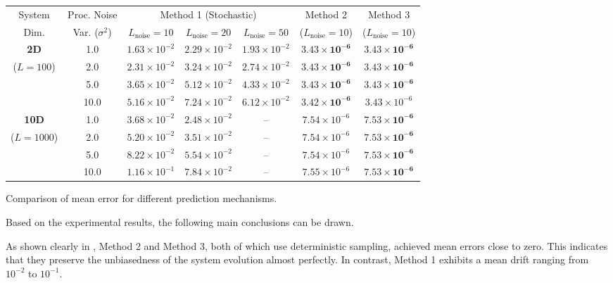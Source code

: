 \begin{Table}[ht]
	\centering
	\small
	\begin{tabular}{|c|c|c|c|c|c|c|}
		\hline
		System & Proc. Noise & \multicolumn{3}{c|}{Method 1 (Stochastic)} & Method 2 & Method 3 \\ \cline{3-5}
		Dim. & Var. ($\sigma^2$) & $L_{\mathrm{noise}}=10$ & $L_{\mathrm{noise}}=20$ & $L_{\mathrm{noise}}=50$ & ($L_{\mathrm{noise}}=10$) & ($L_{\mathrm{noise}}=10$) \\ \hline
		\textbf{2D}  & 1.0  & $1.63 \times 10^{-2}$ & $2.29 \times 10^{-2}$ & $1.93 \times 10^{-2}$ & $\bm{3.43 \times 10^{-6}}$ & $\bm{3.43 \times 10^{-6}}$ \\ \cline{2-7}
		($L=100$)    & 2.0  & $2.31 \times 10^{-2}$ & $3.24 \times 10^{-2}$ & $2.74 \times 10^{-2}$ & $\bm{3.43 \times 10^{-6}}$ & $\bm{3.43 \times 10^{-6}}$ \\ \cline{2-7}
		& 5.0  & $3.65 \times 10^{-2}$ & $5.12 \times 10^{-2}$ & $4.33 \times 10^{-2}$ & $\bm{3.43 \times 10^{-6}}$ & $\bm{3.43 \times 10^{-6}}$ \\ \cline{2-7}
		& 10.0 & $5.16 \times 10^{-2}$ & $7.24 \times 10^{-2}$ & $6.12 \times 10^{-2}$ & $\bm{3.42 \times 10^{-6}}$ & $3.43 \times 10^{-6}$ \\ \hline
		\textbf{10D} & 1.0  & $3.68 \times 10^{-2}$ & $2.48 \times 10^{-2}$ & --     & $7.54 \times 10^{-6}$ & $\bm{7.53 \times 10^{-6}}$ \\ \cline{2-7}
		($L=1000$)   & 2.0  & $5.20 \times 10^{-2}$ & $3.51 \times 10^{-2}$ & --     & $7.54 \times 10^{-6}$ & $\bm{7.53 \times 10^{-6}}$ \\ \cline{2-7}
		& 5.0  & $8.22 \times 10^{-2}$ & $5.54 \times 10^{-2}$ & --     & $7.54 \times 10^{-6}$ & $\bm{7.53 \times 10^{-6}}$ \\ \cline{2-7}
		& 10.0 & $1.16 \times 10^{-1}$ & $7.84 \times 10^{-2}$ & --     & $7.55 \times 10^{-6}$ & $\bm{7.53 \times 10^{-6}}$ \\ \hline
	\end{tabular}
	\caption{Comparison of mean error for different prediction mechanisms.}
	\label{tab:mean_error}
\end{Table}

Based on the experimental results, the following main conclusions can be drawn.

As shown clearly in , Method 2 and Method 3, both of which use deterministic sampling, achieved mean errors close to zero. This indicates that they preserve the unbiasedness of the system evolution almost perfectly. In contrast, Method 1 exhibits a mean drift ranging from $10^{-2}$ to $10^{-1}$.

